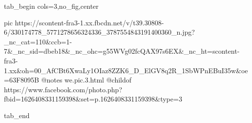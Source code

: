  
 
 
 
 


\ifcmt
  tab_begin cols=3,no_fig,center

     pic https://scontent-fra3-1.xx.fbcdn.net/v/t39.30808-6/330174778_5771278656324336_3787554843191400360_n.jpg?_nc_cat=110&ccb=1-7&_nc_sid=dbeb18&_nc_ohc=g55WVg02fcQAX97s6EX&_nc_ht=scontent-fra3-1.xx&oh=00_AfCBt6XwaLy1OIaz8ZZK6_D_ElGV8q2R_1SbWPnEBuI35w&oe=63F8095B
		 @notes we.pic.3.html
		 @childof https://www.facebook.com/photo.php?fbid=1626408331159398&set=p.1626408331159398&type=3

  tab_end
\fi
